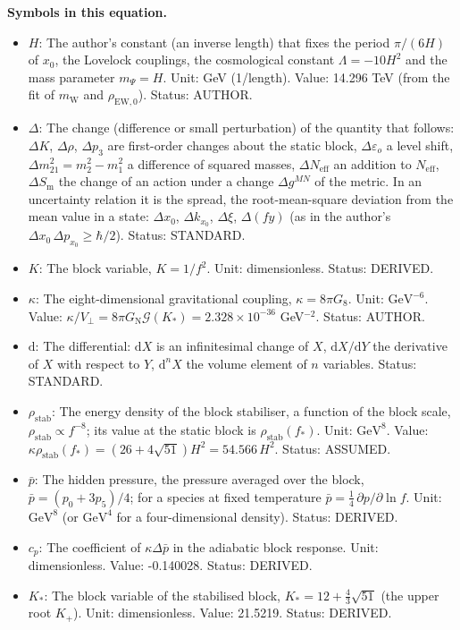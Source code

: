 \documentclass[
  10pt,
]{article}
\providecommand{\tightlist}{%
  \setlength{\itemsep}{0pt}\setlength{\parskip}{0pt}}
\begin{document}
\textbf{Symbols in this equation.}

\begin{itemize}
\tightlist
\item
  \(H\): The author's constant (an inverse length) that fixes the period
  \(\pi/(6H)\) of \(x_0\), the Lovelock couplings, the cosmological
  constant \(\Lambda = -10H^2\) and the mass parameter \(m_\Psi = H\).
  Unit: GeV (1/length). Value: 14.296 TeV (from the fit of
  \(m_{\mathrm{W}}\) and \(\rho_{\mathrm{EW},0}\)). Status: AUTHOR.
\item
  \(\Delta\): The change (difference or small perturbation) of the
  quantity that follows: \(\Delta K\), \(\Delta\rho\), \(\Delta p_3\)
  are first-order changes about the static block,
  \(\Delta\varepsilon_o\) a level shift,
  \(\Delta m^2_{21} = m_2^2 - m_1^2\) a difference of squared masses,
  \(\Delta N_{\mathrm{eff}}\) an addition to \(N_{\mathrm{eff}}\),
  \(\Delta S_{\mathrm{m}}\) the change of an action under a change
  \(\Delta g^{MN}\) of the metric. In an uncertainty relation it is the
  spread, the root-mean-square deviation from the mean value in a state:
  \(\Delta x_0\), \(\Delta k_{x_0}\), \(\Delta\xi\), \(\Delta(fy)\) (as
  in the author's \(\Delta x_0\,\Delta p_{x_0} \ge \hbar/2\)). Status:
  STANDARD.
\item
  \(K\): The block variable, \(K = 1/f^2\). Unit: dimensionless. Status:
  DERIVED.
\item
  \(\kappa\): The eight-dimensional gravitational coupling,
  \(\kappa = 8\pi G_8\). Unit: \(\mathrm{GeV}^{-6}\). Value:
  \(\kappa/V_\perp = 8\pi G_{\mathrm{N}}\mathcal{G}(K_*) = 2.328\times10^{-36}\)
  GeV\(^{-2}\). Status: AUTHOR.
\item
  \(\mathrm{d}\): The differential: \(\mathrm{d}X\) is an infinitesimal
  change of \(X\), \(\mathrm{d}X/\mathrm{d}Y\) the derivative of \(X\)
  with respect to \(Y\), \(\mathrm{d}^nX\) the volume element of \(n\)
  variables. Status: STANDARD.
\item
  \(\rho_{\mathrm{stab}}\): The energy density of the block stabiliser,
  a function of the block scale,
  \(\rho_{\mathrm{stab}} \propto f^{-8}\); its value at the static block
  is \(\rho_{\mathrm{stab}}(f_*)\). Unit: \(\mathrm{GeV}^{8}\). Value:
  \(\kappa\rho_{\mathrm{stab}}(f_*) = (26 + 4\sqrt{51})H^2 = 54.566\,H^2\).
  Status: ASSUMED.
\item
  \(\bar p\): The hidden pressure, the pressure averaged over the block,
  \(\bar p = (p_0 + 3p_5)/4\); for a species at fixed temperature
  \(\bar p = \frac14\,\partial p/\partial\ln f\). Unit:
  \(\mathrm{GeV}^{8}\) (or \(\mathrm{GeV}^{4}\) for a four-dimensional
  density). Status: DERIVED.
\item
  \(c_p\): The coefficient of \(\kappa\Delta\bar p\) in the adiabatic
  block response. Unit: dimensionless. Value: -0.140028. Status:
  DERIVED.
\item
  \(K_*\): The block variable of the stabilised block,
  \(K_* = 12 + \frac43\sqrt{51}\) (the upper root \(K_+\)). Unit:
  dimensionless. Value: 21.5219. Status: DERIVED.
\end{itemize}
\end{document}
